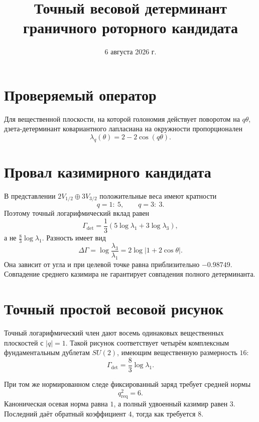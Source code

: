 \documentclass[12pt,a4paper]{article}
\title{Точный весовой детерминант\\граничного роторного кандидата}
\author{}
\date{6 августа 2026 г.}
\begin{document}
\maketitle

\section{Проверяемый оператор}

Для вещественной плоскости, на которой голономия действует поворотом на
\(q\theta\), дзета-детерминант ковариантного лапласиана на окружности
пропорционален
\begin{equation}
 \lambda_q(\theta)=2-2\cos(q\theta).
\end{equation}

\section{Провал казимирного кандидата}

В представлении \(2V_{1/2}\oplus3V_{3/2}\) положительные веса имеют кратности
\begin{equation}
 q=1:\ 5,
 \qquad
 q=3:\ 3.
\end{equation}
Поэтому точный логарифмический вклад равен
\begin{equation}
 \Gamma_{\det}
 =\frac13\left(5\log\lambda_1+3\log\lambda_3\right),
\end{equation}
а не \(\frac83\log\lambda_1\). Разность имеет вид
\begin{equation}
 \Delta\Gamma
 =\log\frac{\lambda_3}{\lambda_1}
 =2\log|1+2\cos\theta|.
\end{equation}
Она зависит от угла и при целевой точке равна приблизительно \(-0.98749\).
Совпадение среднего казимира не гарантирует совпадения полного детерминанта.

\section{Точный простой весовой рисунок}

Точный логарифмический член дают восемь одинаковых вещественных плоскостей
с \(|q|=1\). Такой рисунок соответствует четырём комплексным фундаментальным
дублетам \(SU(2)\), имеющим вещественную размерность \(16\):
\begin{equation}
 \Gamma_{\det}
 =\frac83\log\lambda_1.
\end{equation}

При том же нормированном следе фиксированный заряд требует средней нормы
\begin{equation}
 q^2_{\mathrm{req}}=6.
\end{equation}
Каноническая осевая норма равна \(1\), а полный удвоенный казимир равен
\(3\). Последний даёт обратный коэффициент \(4\), тогда как требуется \(8\).
\end{document}
